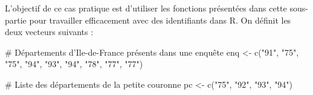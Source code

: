 \documentclass[12pt,twosided, notitlepage]{book}
\newenvironment{Shaded}{}{}
\newcommand{\CommentTok}[1]{\textcolor[rgb]{0.00,0.50,0.00}{#1}}
\newcommand{\KeywordTok}[1]{\textcolor[rgb]{0.00,0.00,1.00}{#1}}
\newcommand{\NormalTok}[1]{#1}
\newcommand{\StringTok}[1]{\textcolor[rgb]{0.00,0.50,0.50}{#1}}
\renewenvironment{Shaded}{\begin{snugshade}}{\end{snugshade}}
\begin{document}

L'objectif de ce cas pratique est d'utiliser les fonctions présentées
dans cette sous-partie pour travailler efficacement avec des
identifiants dans R. On définit les deux vecteurs suivants :

\begin{Shaded}
\begin{Highlighting}[]
\CommentTok{# Départements d'Ile-de-France présents dans une enquête}
\NormalTok{enq <-}\StringTok{ }\KeywordTok{c}\NormalTok{(}\StringTok{"91"}\NormalTok{, }\StringTok{"75"}\NormalTok{, }\StringTok{"75"}\NormalTok{, }\StringTok{"94"}\NormalTok{, }\StringTok{"93"}\NormalTok{, }\StringTok{"94"}\NormalTok{, }\StringTok{"78"}\NormalTok{, }\StringTok{"77"}\NormalTok{, }\StringTok{"77"}\NormalTok{)}

\CommentTok{# Liste des départements de la petite couronne}
\NormalTok{pc <-}\StringTok{ }\KeywordTok{c}\NormalTok{(}\StringTok{"75"}\NormalTok{, }\StringTok{"92"}\NormalTok{, }\StringTok{"93"}\NormalTok{, }\StringTok{"94"}\NormalTok{)}
\end{Highlighting}
\end{Shaded}
\end{document}
